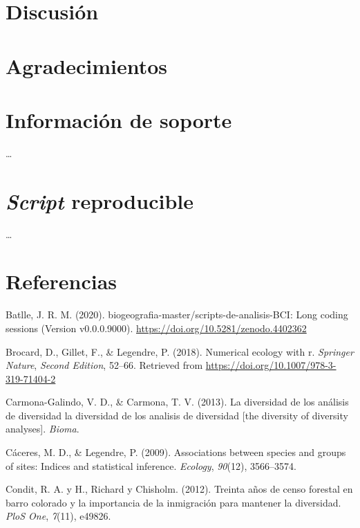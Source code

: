 \documentclass[11pt,]{article}
\begin{document}
\section{Discusión}\label{discusiuxf3n}

\section{Agradecimientos}\label{agradecimientos}

\section{Información de soporte}\label{informaciuxf3n-de-soporte}

\ldots

\section{\texorpdfstring{\emph{Script}
reproducible}{Script reproducible}}\label{script-reproducible}

\ldots

\section*{Referencias}\label{referencias}

\hypertarget{refs}{}
\hypertarget{ref-jose_ramon_martinez_batlle_2020_4402362}{}
Batlle, J. R. M. (2020). biogeografia-master/scripts-de-analisis-BCI:
Long coding sessions (Version v0.0.0.9000).
\url{https://doi.org/10.5281/zenodo.4402362}

\hypertarget{ref-brocard2011numerical}{}
Brocard, D., Gillet, F., \& Legendre, P. (2018). Numerical ecology with
r. \emph{Springer Nature}, \emph{Second Edition}, 52--66. Retrieved from
\url{https://doi.org/10.1007/978-3-319-71404-2}

\hypertarget{ref-carmona2013diversidad}{}
Carmona-Galindo, V. D., \& Carmona, T. V. (2013). La diversidad de los
análisis de diversidad la diversidad de los analisis de diversidad
{[}the diversity of diversity analyses{]}. \emph{Bioma}.

\hypertarget{ref-caceres2009associations}{}
Cáceres, M. D., \& Legendre, P. (2009). Associations between species and
groups of sites: Indices and statistical inference. \emph{Ecology},
\emph{90}(12), 3566--3574.

\hypertarget{ref-condit2012thirty}{}
Condit, R. A. y H., Richard y Chisholm. (2012). Treinta años de censo
forestal en barro colorado y la importancia de la inmigración para
mantener la diversidad. \emph{PloS One}, \emph{7}(11), e49826.
\end{document}
